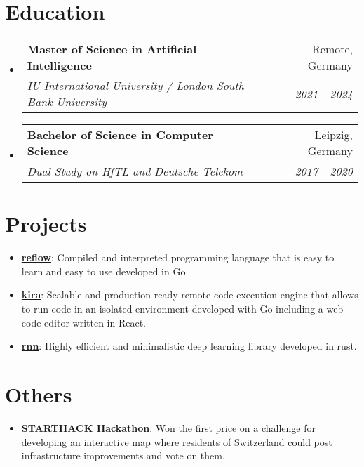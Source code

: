 \documentclass[letterpaper,11pt]{article}
\makeatletter
\newcommand{\resumeItem}[2]{
  \item\small{
    \textbf{#1}{: #2}
  }
}
\newcommand{\resumeSubheading}[4]{
  \vspace{-1pt}\item
    \begin{tabular*}{0.97\textwidth}[t]{l@{\extracolsep{\fill}}r}
      \textbf{#1} & #2 \\
      \textit{\small#3} & \textit{\small #4} \\
    \end{tabular*}
}
\newcommand{\resumeSubItem}[2]{\resumeItem{#1}{#2}}
\newcommand{\resumeSubHeadingListStart}{\begin{itemize}[leftmargin=*]}
\newcommand{\resumeSubHeadingListEnd}{\end{itemize}}
\makeatother
\begin{document}
\section{Education}
  \resumeSubHeadingListStart
    \resumeSubheading
      {Master of Science in Artificial Intelligence}{Remote, Germany}
      {IU International University / London South Bank University}{2021 - 2024}
      \vspace{-10pt}
    \resumeSubheading
      {Bachelor of Science in Computer Science}{Leipzig, Germany}
      {Dual Study on HfTL and Deutsche Telekom}{2017 - 2020}
  \resumeSubHeadingListEnd


\section{Projects}
  \resumeSubHeadingListStart
    \resumeSubItem{\href{https://github.com/FlorianWoelki/reflow}{reflow}}
      {Compiled and interpreted programming language that is easy to learn and easy to use developed in Go.}
      \vspace{-5pt}
    \resumeSubItem{\href{https://github.com/FlorianWoelki/kira}{kira}}
      {Scalable and production ready remote code execution engine that allows to run code in an isolated environment developed with Go including a web code editor written in React.}
      \vspace{-5pt}
    \resumeSubItem{\href{https://github.com/FlorianWoelki/rnn}{rnn}}
      {Highly efficient and minimalistic deep learning library developed in rust.}
      \vspace{-5pt}
  \resumeSubHeadingListEnd


\section{Others}
  \resumeSubHeadingListStart
    \resumeSubItem{STARTHACK Hackathon}
      {Won the first price on a challenge for developing an interactive map where residents of Switzerland could post infrastructure improvements and vote on them.}
  \resumeSubHeadingListEnd
\end{document}

